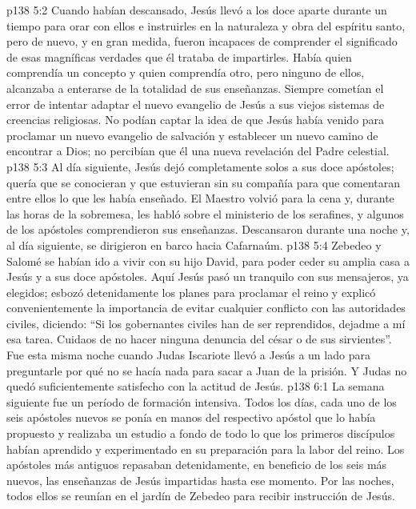 \vs p138 5:2 \pc Cuando habían descansado, Jesús llevó a los doce aparte durante un tiempo para orar con ellos e instruirles en la naturaleza y obra del espíritu santo, pero de nuevo, y en gran medida, fueron incapaces de comprender el significado de esas magníficas verdades que él trataba de impartirles. Había quien comprendía un concepto y quien comprendía otro, pero ninguno de ellos, alcanzaba a enterarse de la totalidad de sus enseñanzas. Siempre cometían el error de intentar adaptar el nuevo evangelio de Jesús a sus viejos sistemas de creencias religiosas. No podían captar la idea de que Jesús había venido para proclamar un nuevo evangelio de salvación y establecer un nuevo camino de encontrar a Dios; no percibían que él  una nueva revelación del Padre celestial.
\vs p138 5:3 Al día siguiente, Jesús dejó completamente solos a sus doce apóstoles; quería que se conocieran y que estuvieran sin su compañía para que comentaran entre ellos lo que les había enseñado. El Maestro volvió para la cena y, durante las horas de la sobremesa, les habló sobre el ministerio de los serafines, y algunos de los apóstoles comprendieron sus enseñanzas. Descansaron durante una noche y, al día siguiente, se dirigieron en barco hacia Cafarnaúm.
\vs p138 5:4 Zebedeo y Salomé se habían ido a vivir con su hijo David, para poder ceder su amplia casa a Jesús y a sus doce apóstoles. Aquí Jesús pasó un  tranquilo con sus mensajeros, ya elegidos; esbozó detenidamente los planes para proclamar el reino y explicó convenientemente la importancia de evitar cualquier conflicto con las autoridades civiles, diciendo: “Si los gobernantes civiles han de ser reprendidos, dejadme a mí esa tarea. Cuidaos de no hacer ninguna denuncia del césar o de sus sirvientes”. Fue esta misma noche cuando Judas Iscariote llevó a Jesús a un lado para preguntarle por qué no se hacía nada para sacar a Juan de la prisión. Y Judas no quedó suficientemente satisfecho con la actitud de Jesús.
\vs p138 6:1 La semana siguiente fue un período de formación intensiva. Todos los días, cada uno de los seis apóstoles nuevos se ponía en manos del respectivo apóstol que lo había propuesto y realizaba un estudio a fondo de todo lo que los primeros discípulos habían aprendido y experimentado en su preparación para la labor del reino. Los apóstoles más antiguos repasaban detenidamente, en beneficio de los seis más nuevos, las enseñanzas de Jesús impartidas hasta ese momento. Por las noches, todos ellos se reunían en el jardín de Zebedeo para recibir instrucción de Jesús.
